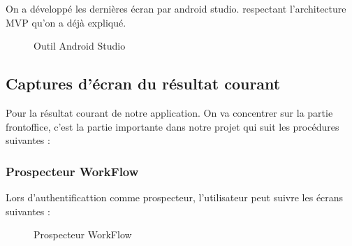 On a d\'evelopp\'e les derni\`eres \'ecran par android studio. respectant l'architecture \gls{MVP} qu'on a d\'ej\`a expliqu\'e.

\begin{figure}[H]
	\caption{\label{fig:my-label} Outil Android Studio}
\end{figure}

\subsection{Captures d'\'ecran du r\'esultat courant}

Pour la r\'esultat courant de notre application. On va concentrer sur la partie frontoffice, c'est la partie importante dans notre projet qui suit les proc\'edures suivantes : 

\subsubsection{Prospecteur WorkFlow}

Lors d'authentificattion comme prospecteur, l'utilisateur peut suivre les \'ecrans suivantes :

\begin{figure}[H]
	\caption{\label{fig:my-label} Prospecteur WorkFlow}
\end{figure}

